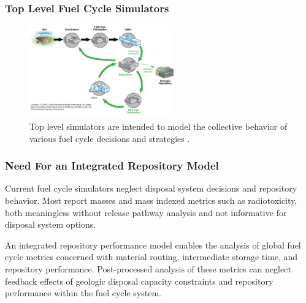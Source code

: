 

\begin{frame}[ctb!]
  \frametitle{Top Level Fuel Cycle Simulators}
  \begin{figure}[htbp!]
    \begin{center}
      \includegraphics[height=4cm]{./images/simulations.eps}
    \end{center}
    \caption{Top level simulators are intended to model the collective 
    behavior of various fuel cycle decisions and 
    strategies \cite{lisowski_global_2007}.}
    \label{fig:simulation}
  \end{figure}
\end{frame}

\begin{frame}[ctb!]
  \frametitle{Need For an Integrated Repository Model}
  \footnotesize{
  Current fuel cycle simulators neglect disposal system decisions and 
  repository behavior. Most report masses and mass indexed metrics such 
  as radiotoxicity, both meaningless without release pathway analysis
  and not informative for disposal system options.

  
An integrated repository performance model enables the analysis of global fuel 
cycle metrics concerned with material routing, intermediate storage time, and 
repository performance. Post-processed analysis of these metrics can neglect 
feedback effects of geologic disposal capacity constraints and repository 
performance within the fuel cycle system.
}

\end{frame}

